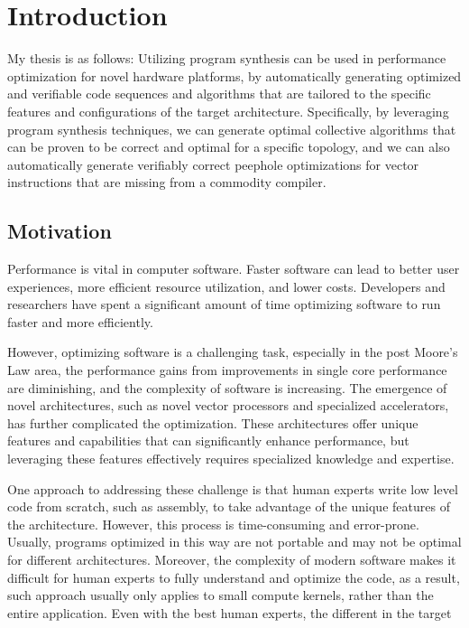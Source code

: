 \chapter{Introduction}
\label{chap:intro}

My thesis is as follows:
%
Utilizing program synthesis can be used in performance optimization
for novel hardware platforms, by automatically generating optimized
and verifiable code sequences and algorithms that are tailored to the
specific features and configurations of the target architecture.
%
Specifically, by leveraging program synthesis techniques, we can
generate optimal collective algorithms that can be proven to be
correct and optimal for a specific topology,
%
and we can also automatically generate verifiably correct peephole
optimizations for vector instructions that are missing from a
commodity compiler.


\section{Motivation}

Performance is vital in computer software.
%
Faster software can lead to better user experiences, more efficient
resource utilization, and lower costs. Developers and researchers have
spent a significant amount of time optimizing software to run faster
and more efficiently.

However, optimizing software is a challenging task, especially in the
post Moore's Law area, the performance gains from improvements in
single core performance are diminishing, and the complexity of
software is increasing.
%
The emergence of novel architectures, such as novel vector processors
and specialized accelerators, has further complicated the optimization.
These architectures offer unique features and capabilities that can
significantly enhance performance, but leveraging these features
effectively requires specialized knowledge and expertise.

One approach to addressing these challenge is that human experts write
low level code from scratch, such as assembly, to take advantage of
the unique features of the architecture.
%
However, this process is time-consuming and
error-prone. Usually, programs optimized in this way are not
portable and may not be optimal for different architectures.
%
Moreover, the complexity of modern software makes it difficult for
human experts to fully understand and optimize the code, as a result,
such approach usually only applies to small compute kernels, rather than
the entire application.
%
Even with the best human experts, the different in the target





